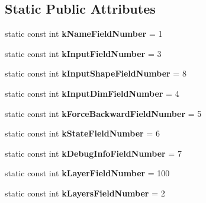 \subsection*{Static Public Attributes}
\begin{DoxyCompactItemize}
\item 
\mbox{\label{classcaffe_1_1_net_parameter_abc236614f55566ddafb52adefeb96011}} 
static const int {\bfseries k\+Name\+Field\+Number} = 1
\item 
\mbox{\label{classcaffe_1_1_net_parameter_af8c0e230cece955d2d54ef8025e820c9}} 
static const int {\bfseries k\+Input\+Field\+Number} = 3
\item 
\mbox{\label{classcaffe_1_1_net_parameter_abf03a73240e359f06acdd333a4e60d8f}} 
static const int {\bfseries k\+Input\+Shape\+Field\+Number} = 8
\item 
\mbox{\label{classcaffe_1_1_net_parameter_ac5b9797c2a9af8c786ef57244e8e80a3}} 
static const int {\bfseries k\+Input\+Dim\+Field\+Number} = 4
\item 
\mbox{\label{classcaffe_1_1_net_parameter_a95c56d1b37c4d56eb48d9ca4564453a7}} 
static const int {\bfseries k\+Force\+Backward\+Field\+Number} = 5
\item 
\mbox{\label{classcaffe_1_1_net_parameter_acfb42bc135c79a3f3ac7cd4038052777}} 
static const int {\bfseries k\+State\+Field\+Number} = 6
\item 
\mbox{\label{classcaffe_1_1_net_parameter_a2370204f7a563652e293acd7ce8c2a5a}} 
static const int {\bfseries k\+Debug\+Info\+Field\+Number} = 7
\item 
\mbox{\label{classcaffe_1_1_net_parameter_ac4c2e155d9c6971c562763497c0fd450}} 
static const int {\bfseries k\+Layer\+Field\+Number} = 100
\item 
\mbox{\label{classcaffe_1_1_net_parameter_ac298319000270007c8bfddbd8eca3898}} 
static const int {\bfseries k\+Layers\+Field\+Number} = 2
\end{DoxyCompactItemize}

